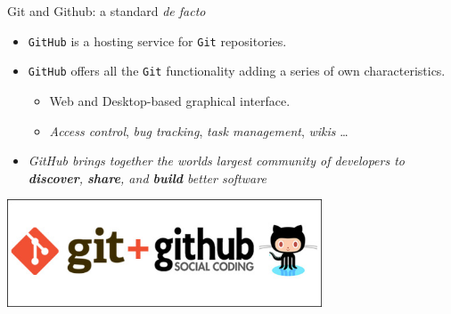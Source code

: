 \documentclass[ignorenonframetext,]{beamer}
\providecommand{\tightlist}{%
  \setlength{\itemsep}{0pt}\setlength{\parskip}{0pt}}
\begin{document}
\begin{frame}[fragile]{%
\protect\hypertarget{git-and-github-a-standard-de-facto}{%
Git and Github: a standard \emph{de facto}}}

\begin{itemize}
\tightlist
\item
  \texttt{GitHub} is a hosting service for \texttt{Git} repositories.
\item
  \texttt{GitHub} offers all the \texttt{Git} functionality adding a
  series of own characteristics.

  \begin{itemize}
  \tightlist
  \item
    Web and Desktop-based graphical interface.
  \item
    \emph{Access control}, \emph{bug tracking}, \emph{task management},
    \emph{wikis} \ldots{}
  \end{itemize}
\item
  \emph{GitHub brings together the worlds largest community of
  developers to \textbf{discover}, \textbf{share}, and \textbf{build}
  better software}
\end{itemize}

\begin{center}
\includegraphics[width=0.7\textwidth]{"images/gitAndGithub"}
\end{center}

\end{frame}
\end{document}
